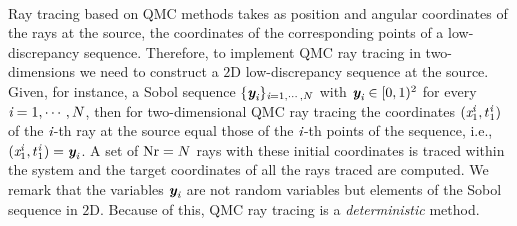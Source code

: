 \\ \indent Ray tracing based on QMC methods takes as position and angular coordinates of the rays at the source, the coordinates of the corresponding points of a low-discrepancy sequence. 
Therefore, to implement QMC ray tracing in two-dimensions we need to construct a $2$D low-discrepancy sequence at the source.  
Given, for instance, a Sobol sequence $\{\textit{\textbf{y}}_{\textit{i}}\}_{\textit{i}=1, \cdots, N}$ with $\textit{\textbf{y}}_{\textit{i}}\in[0,1)^2$ for every $\textit{i}=1, \cdots, N$, then for two-dimensional QMC ray tracing the coordinates $(\textit{x}_1^{\textit{i}}, t_1^{\textit{i}})$ of the $\textit{i}$-th ray at the source equal those of the $\textit{i}$-th points of the sequence, i.e., $(\textit{x}_1^{\textit{i}}, t_1^{\textit{i}})=\textit{\textbf{y}}_{\textit{i}}$. A set of $\textrm{Nr} = N$ rays with these initial coordinates is traced within the system and the target coordinates of all the rays traced are computed. We remark that the variables $\textit{\textbf{y}}_{\textit{i}}$ are not random variables but elements of the Sobol sequence in $2$D. Because of this, QMC ray tracing is a \textit{deterministic} method.\\ \indent 
